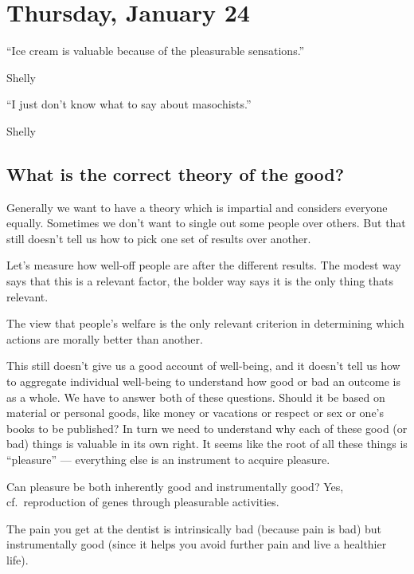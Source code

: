 
\section{Thursday, January 24}

\epigraph{``Ice cream is valuable because of the pleasurable sensations.''}{Shelly}

\epigraph{``I just don't know what to say about masochists.''}{Shelly}

\subsection{What is the correct theory of the good?}

Generally we want to have a theory which is impartial and considers everyone equally. Sometimes we don't want to single out some people over others. But that still doesn't tell us how to pick one set of results over another.

\begin{proposition}
Let's measure how well-off people are after the different results. The modest way says that this is a relevant factor, the bolder way says it is the only thing thats relevant.
\end{proposition}

\begin{definition}[Welfarism]
The view that people's welfare is the only relevant criterion in determining which actions are morally better than another.
\end{definition}

This still doesn't give us a good account of well-being, and it doesn't tell us how to aggregate individual well-being to understand how good or bad an outcome is as a whole. We have to answer both of these questions. Should it be based on material or personal goods, like money or vacations or respect or sex or one's books to be published? In turn we need to understand why each of these good (or bad) things is valuable in its own right. It seems like the root of all these things is ``pleasure'' --- everything else is an instrument to acquire pleasure.

\begin{problem}
Can pleasure be both inherently good and instrumentally good? Yes, cf.\ reproduction of genes through pleasurable activities.
\end{problem}

\begin{example}
The pain you get at the dentist is intrinsically bad (because pain is bad) but instrumentally good (since it helps you avoid further pain and live a healthier life).
\end{example}

